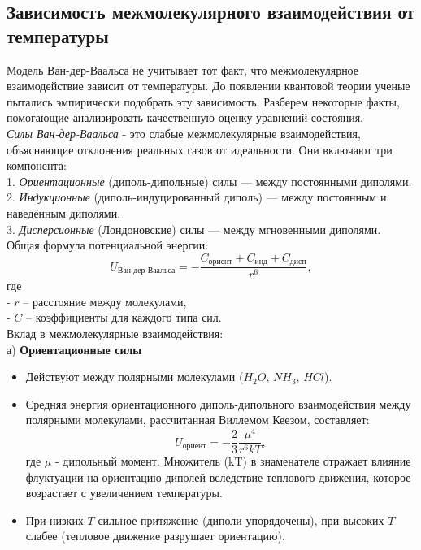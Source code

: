 \documentclass[a4paper]{article}
\numberwithin{equation}{subsection} %
\begin{document}
\subsection{Зависимость межмолекулярного взаимодействия от температуры}
Модель Ван-дер-Ваальса не учитывает тот факт, что межмолекулярное взаимодействие зависит от температуры. До появлении квантовой теории ученые пытались эмпирически подобрать эту зависимость. Разберем некоторые факты, помогающие анализировать качественную оценку уравнений состояния.\\
\textit{Силы Ван-дер-Ваальса} - это слабые межмолекулярные взаимодействия, объясняющие отклонения реальных газов от идеальности. Они включают три компонента:\\
1. \textit{Ориентационные} (диполь-дипольные) силы — между постоянными диполями.\\
2. \textit{Индукционные} (диполь-индуцированный диполь) — между постоянным и наведённым диполями.\\
3. \textit{Дисперсионные} (Лондоновские) силы — между мгновенными диполями.
Общая формула потенциальной энергии: 
\begin{equation}
      U_{\text{Ван-дер-Ваальса}} = -\frac{C_{\text{ориент}} + C_{\text{инд}} + C_{\text{дисп}}}{r^6}, 
\end{equation}
где \\
- $r$ -- расстояние между молекулами,\\
- $C$ -- коэффициенты для каждого типа сил.\\
Вклад в межмолекулярные взаимодействия: \\
а) \textbf{Ориентационные силы}\\
\begin{itemize}
\item Действуют между полярными молекулами ($H_2O$, $NH_3$, $HCl$).

\item Средняя энергия ориентационного диполь-дипольного взаимодействия между полярными молекулами, рассчитанная Виллемом Кеезом, составляет:
\begin{equation}
      U_{\text{ориент}} = -\frac{2}{3} \frac{\mu^4}{r^6kT},
\end{equation}
где $\mu$ - дипольный момент. Множитель (kT) в знаменателе отражает влияние флуктуации на ориентацию диполей вследствие теплового движения, которое возрастает с увеличением температуры. 
\item При низких $T$ сильное притяжение (диполи упорядочены), при высоких $T$ слабее (тепловое движение разрушает ориентацию).\\
\end{itemize}
\end{document}
